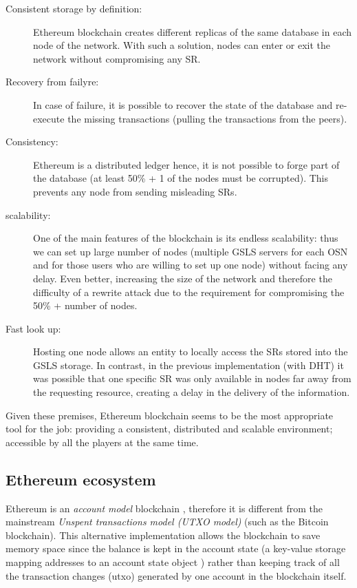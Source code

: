 \begin{description}
  \item[Consistent storage by definition:] Ethereum blockchain creates different replicas of the same database in each node of the network. With such a solution, nodes can enter or exit the network without compromising any SR.
  \item[Recovery from failyre:] In case of failure, it is possible to recover the state of the database and re-execute the missing transactions (pulling the transactions from the peers).
  \item[Consistency:] Ethereum is a distributed ledger hence, it is not possible to forge part of the database (at least 50\% + 1 of the nodes must be corrupted). This prevents any node from sending misleading SRs.
  \item[scalability:] One of the main features of the blockchain is its endless scalability: thus we can set up large number of nodes (multiple GSLS servers for each OSN and for those users who are willing to set up one node) without facing any delay.
  Even better, increasing the size of the network and therefore the difficulty of a rewrite attack due to the requirement for compromising the 50\% + number of nodes.
  \item[Fast look up:] Hosting one node allows an entity to locally access the SRs stored into the GSLS storage. In contrast, in the previous implementation (with DHT) it was possible that one specific SR was only available in nodes far away from the requesting resource, creating a delay in the delivery of the information. 
\end{description}

Given these premises, Ethereum blockchain seems to be the most appropriate tool for the job: providing a consistent, distributed and scalable environment; accessible by all the players at the same time.


\subsection{Ethereum ecosystem}
\label{ethereumEcosystem:1}

Ethereum is an \textit{account model} blockchain \cite{ethereum_whitepaper}, therefore it is different from the mainstream \textit{Unspent transactions model (UTXO model)}  (such as the Bitcoin blockchain). This alternative implementation allows the blockchain to save memory space since the balance is kept in the account state (a key-value storage mapping addresses to an account state object \cite{ethereum_yellowpaper}) rather than keeping track of all the transaction changes (utxo) generated by one account in the blockchain itself.

